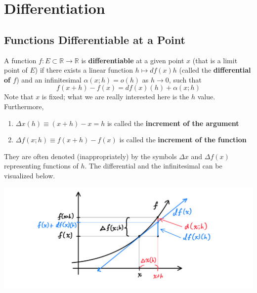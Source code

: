 \section{Differentiation}

  \subsection{Functions Differentiable at a Point}

    \begin{definition}
      A function $f: E \subset \mathbb{R} \longrightarrow \mathbb{R}$ is \textbf{differentiable} at a given point $x$ (that is a limit point of $E$) if there exists a linear function $h \mapsto df(x) h$ (called the \textbf{differential of $f$}) and an infinitesimal $\alpha (x;h) = o(h)$ as $h \rightarrow 0$, such that
      \[f(x + h) - f(x) = df(x) (h) + \alpha (x; h)\]
      Note that $x$ is fixed; what we are really interested here is the $h$ value. Furthermore, 
      \begin{enumerate}
        \item $\Delta x(h) \equiv (x + h) - x = h$ is called the \textbf{increment of the argument}
        \item $\Delta f(x;h) \equiv f(x + h) - f(x)$ is called the \textbf{increment of the function} 
      \end{enumerate}
      They are often denoted (inappropriately) by the symbols $\Delta x$ and $\Delta f(x)$ representing functions of $h$. The differential and the infinitesimal can be visualized below. 
      \begin{center}
          \includegraphics[scale=0.25]{img/Differential_Diagram.PNG}
      \end{center}
    \end{definition}

